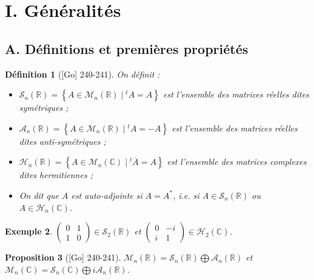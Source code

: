 \documentclass[10pt, a4paper, parskip=full, twoside, twocolumn]{report}
\newtheorem{definition}{Définition}
\newtheorem{proposition}[definition]{Proposition}
\newtheorem{example}[definition]{Exemple}
\newcommand{\IC}{\mathbb{C}}
\newcommand{\IR}{\mathbb{R}}
\newcommand{\M}{\mathcal{M}}
\newcommand{\A}{\mathcal{A}}
\begin{document}
\section*{I. Généralités}
\subsection*{A. Définitions et premières propriétés}

\begin{definition}[\textnormal{[Go] 240-241}]
	On définit :
	\begin{itemize}
		\item $\mathcal{S}_n(\IR) = \left\{A\in\M_n(\IR)\mid {}^tA=A\right\}$ est l'ensemble des matrices réelles dites \emph{symétriques} ;
		\item $\A_n(\IR) = \left\{A\in\M_n(\IR)\mid {}^tA=-A\right\}$ est l'ensemble des matrices réelles dites \emph{anti-symétriques} ;
		\item $\mathcal{H}_n(\IR) = \left\{A\in\M_n(\IC)\mid {}^t\overline{A} = A\right\}$ est l'ensemble des matrices complexes dites \emph{hermitiennes} ;
		\item On dit que $A$ est \emph{auto-adjointe} si $A=A^*$, \emph{i.e.} si $A\in \mathcal{S}_n(\IR)$ ou $A\in\mathcal{H}_n(\IC)$.
	\end{itemize}
\end{definition}

\begin{example}
	$\left(\begin{smallmatrix}
		0&1\\1&0
	\end{smallmatrix}\right)\in\mathcal{S}_2(\IR)$ et 
	$\left(\begin{smallmatrix}
		0&-i\\i&1
	\end{smallmatrix}\right)\in\mathcal{H}_2(\IC)$.
\end{example}

\begin{proposition}[\textnormal{[Go] 240-241}]
	$\M_n(\IR) = \mathcal{S}_n(\IR)\bigoplus\A_n(\IR)$
	et $\M_n(\IC) = \mathcal{S}_n(\IC)\bigoplus i\A_n(\IR)$.
\end{proposition}
\end{document}
